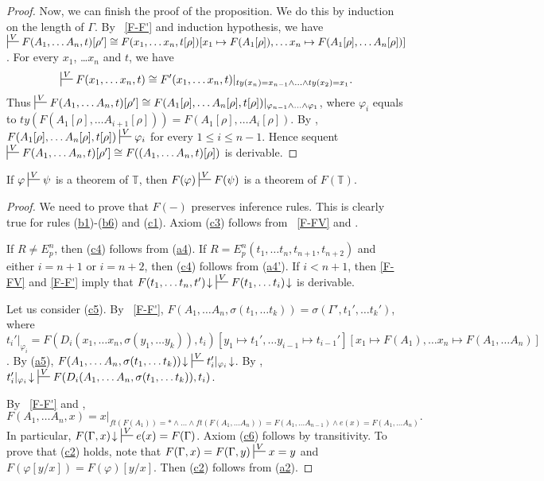 \documentclass[reqno]{amsart}
\newcommand{\axref}[1]{(\hyperref[ax:#1]{#1})}
\theoremstyle{definition}
\theoremstyle{remark}
\numberwithin{figure}{section}
\begin{document}
\begin{proof}
Now, we can finish the proof of the proposition.
We do this by induction on the length of $\Gamma$.
By ~\eqref{F-F'} and induction hypothesis, we have
$\sststile{}{V} F(A_1, \ldots A_n, t)[\rho'] \cong F(x_1, \ldots x_n, t[\rho])[x_1 \mapsto F(A_1[\rho]), \ldots x_n \mapsto F(A_1[\rho], \ldots A_n[\rho])]$.
For every $x_1$, \ldots $x_n$ and $t$, we have
\[ \sststile{}{V} F(x_1, \ldots x_n, t) \cong F'(x_1, \ldots x_n, t)|_{ty(x_n) = x_{n-1} \land \ldots \land ty(x_2) = x_1}. \]
Thus $\sststile{}{V} F(A_1, \ldots A_n, t)[\rho'] \cong F(A_1[\rho], \ldots A_n[\rho], t[\rho])|_{\varphi_{n-1} \land \ldots \land \varphi_1}$,
    where $\varphi_i$ equals to $ty(F(A_1[\rho], \ldots A_{i+1}[\rho])) = F(A_1[\rho], \ldots A_i[\rho])$.
By , $F(A_1[\rho], \ldots A_n[\rho], \allowbreak t[\rho]) \sststile{}{V} \varphi_i$ for every $1 \leq i \leq n-1$.
Hence sequent $\sststile{}{V} F(A_1, \ldots A_n, t)[\rho'] \cong F((A_1, \ldots A_n, t)[\rho])$ is derivable.
\end{proof}

\begin{prop}
If $\varphi \sststile{}{V} \psi$ is a theorem of $\mathbb{T}$, then $F(\varphi) \sststile{}{V} F(\psi)$ is a theorem of $F(\mathbb{T})$.
\end{prop}
\begin{proof}
We need to prove that $F(-)$ preserves inference rules.
This is clearly true for rules \axref{b1}-\axref{b6} and \axref{c1}.
Axiom \axref{c3} follows from ~\eqref{F-FV} and .

If $R \neq E^n_p$, then \axref{c4} follows from \axref{a4}.
If $R = E^n_p(t_1, \ldots t_n, t_{n+1}, t_{n+2})$ and either $i = n+1$ or $i = n+2$, then \axref{c4} follows from \axref{a4'}.
If $i < n+1$, then  \eqref{F-FV} and \eqref{F-F'} imply that $F(t_1, \ldots t_n, t')\!\downarrow\ \sststile{}{V} F(t_1, \ldots t_i)\!\downarrow$ is derivable.

Let us consider \axref{c5}.
By ~\eqref{F-F'}, $F(A_1, \ldots A_n, \sigma(t_1, \ldots t_k)) = \sigma(\Gamma', t_1', \ldots t_k')$, where
    $t_i'|_{\varphi_i} = F(D_i(x_1, \ldots x_n, \sigma(y_1, \ldots y_k)), t_i)[y_1 \mapsto t_1', \ldots y_{i-1} \mapsto t_{i-1}'][x_1 \mapsto F(A_1), \ldots x_n \mapsto F(A_1, \ldots A_n)]$.
By \axref{a5}, $F(A_1, \ldots A_n, \sigma(t_1, \ldots t_k))\!\downarrow\ \sststile{}{V} t_i'|_{\varphi_i}\!\downarrow$.
By , $t_i'|_{\varphi_i}\!\downarrow\ \sststile{}{V} F(D_i(A_1, \ldots A_n, \sigma(t_1, \ldots t_k)), t_i)$.

By ~\eqref{F-F'} and ,
\[ F(A_1, \ldots A_n, x) = x|_{ft(F(A_1)) = * \land \ldots \land ft(F(A_1, \ldots A_n)) = F(A_1, \ldots A_{n-1}) \land e(x) = F(A_1, \ldots A_n)}. \]
In particular, $F(\Gamma,x)\!\downarrow\ \sststile{}{V} e(x) = F(\Gamma)$.
Axiom \axref{c6} follows by transitivity.
To prove that \axref{c2} holds, note that $F(\Gamma,x) = F(\Gamma,y) \sststile{}{V} x = y$ and $F(\varphi[y/x]) = F(\varphi)[y/x]$.
Then \axref{c2} follows from \axref{a2}.
\end{proof}
\end{document}
